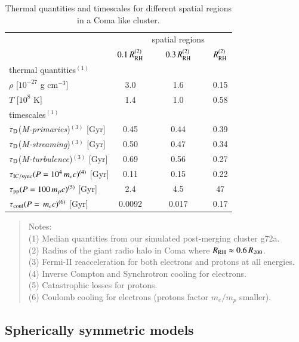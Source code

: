 \documentclass[a4paper,fleqn,usenatbib]{mnras}
\newcommand{\Mstream}{{\it M-streaming}\xspace}
\newcommand{\Mflatturb}{{\it M-turbulence}\xspace}
\newcommand{\Mprimary}{{\it M-primaries}\xspace}
\newcommand{\RH}{R_\rmn{RH}}
\begin{document}
\begin{table}
  \caption{Thermal quantities and timescales for different spatial
    regions in a Coma like cluster.}
\begin{tabular}{l c  c c}
\hline
\hline
& & spatial regions & \\
 & $0.1\,\RH^{(2)}$ & $0.3\,\RH^{(2)}$ & $\RH^{(2)}$   \\
\hline
thermal quantities$^{(1)}$ & & & \\
$\rho$ [$10^{-27}$ g cm$^{-3}$] & 3.0 & 1.6 & 0.15 \\
$T$ [$10^{8}$ K] & 1.4 & 1.0 & 0.58 \\
\hline
timescales$^{(1)}$ & & & \\
$\tau_{\mathrm{D}}$(\Mprimary)$^{(3)}$ [Gyr] & 0.45 & 0.44 & 0.39 \\
$\tau_{\mathrm{D}}$(\Mstream)$^{(3)}$  [Gyr] & 0.50 & 0.47 & 0.34 \\
$\tau_{\mathrm{D}}$(\Mflatturb)$^{(3)}$  [Gyr] & 0.69 & 0.56 & 0.27 \\
$\tau_{\mathrm{IC/sync}}(P=10^4\,m_ec)^{(4)}$ [Gyr] & 0.11 & 0.15 & 0.22 \\
$\tau_{\mathrm{pp}}(P=100\,m_pc)^{(5)}$ [Gyr] & 2.4 & 4.5 & 47 \\
$\tau_{\mathrm{coul}}(P=\,m_ec)^{(6)}$  [Gyr] & 0.0092 & 0.017 & 0.17 \\
\hline
\end{tabular}
\begin{quote}
 Notes: \\ 
 (1) Median quantities from our simulated post-merging cluster g72a.\\
 (2) Radius of the giant radio halo in Coma where $\RH\approx0.6\,R_{200}$.\\
 (3) Fermi-II reacceleration for both electrons and protons at all energies.\\
 (4) Inverse Compton and Synchrotron cooling for electrons.\\
 (5) Catastrophic losses for protons.\\
 (6) Coulomb cooling for electrons (protons factor $m_e/m_p$ smaller).\\

 \label{tab:timescales}
  \end{quote}
\end{table} 


\subsection{Spherically symmetric models}
\end{document}
